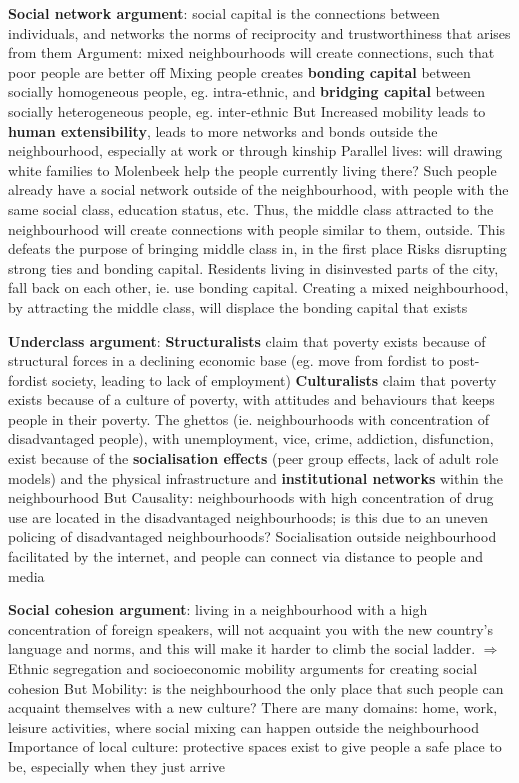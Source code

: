 \documentclass{article}
\begin{document}
\begin{outline}
	\1 \textbf{Social network argument}: social capital is the connections between individuals, and networks the norms of reciprocity and trustworthiness that arises from them
		\2 Argument: mixed neighbourhoods will create connections, such that poor people are better off
		\2 Mixing people creates \textbf{bonding capital} between socially homogeneous people, eg. intra-ethnic, and \textbf{bridging capital} between socially heterogeneous people, eg. inter-ethnic
		\2 But
			\3 Increased mobility leads to \textbf{human extensibility}, leads to more networks and bonds outside the neighbourhood, especially at work or through kinship
			\3 Parallel lives: will drawing white families to Molenbeek help the people currently living there? Such people already have a social network outside of the neighbourhood, with people with the same social class, education status, etc. Thus, the middle class attracted to the neighbourhood will create connections with people similar to them, outside. This defeats the purpose of bringing middle class in, in the first place
			\3 Risks disrupting strong ties and bonding capital. Residents living in disinvested parts of the city, fall back on each other, ie. use bonding capital. Creating a mixed neighbourhood, by attracting the middle class, will displace the bonding capital that exists
			
	\1 \textbf{Underclass argument}:
		\2 \textbf{Structuralists} claim that poverty exists because of structural forces in a declining economic base (eg. move from fordist to post-fordist society, leading to lack of employment)
		\2 \textbf{Culturalists} claim that poverty exists because of a culture of poverty, with attitudes and behaviours that keeps people in their poverty. The ghettos (ie. neighbourhoods with concentration of disadvantaged people), with unemployment, vice, crime, addiction, disfunction, exist because of the \textbf{socialisation effects} (peer group effects, lack of adult role models) and the physical infrastructure and \textbf{institutional networks} within the neighbourhood
		\2 But
			\3 Causality: neighbourhoods with high concentration of drug use are located in the disadvantaged neighbourhoods; is this due to an uneven policing of disadvantaged neighbourhoods?
			\3 Socialisation outside neighbourhood facilitated by the internet, and people can connect via distance to people and media
	
	\1 \textbf{Social cohesion argument}: living in a neighbourhood with a high concentration of foreign speakers, will not acquaint you with the new country's language and norms, and this will make it harder to climb the social ladder. $\Rightarrow$ Ethnic segregation and socioeconomic mobility arguments for creating social cohesion
		\2 But
			\3 Mobility: is the neighbourhood the only place that such people can acquaint themselves with a new culture? There are many domains: home, work, leisure activities, where social mixing can happen outside the neighbourhood
			\3 Importance of local culture: protective spaces exist to give people a safe place to be, especially when they just arrive


\end{outline}
\end{document}

